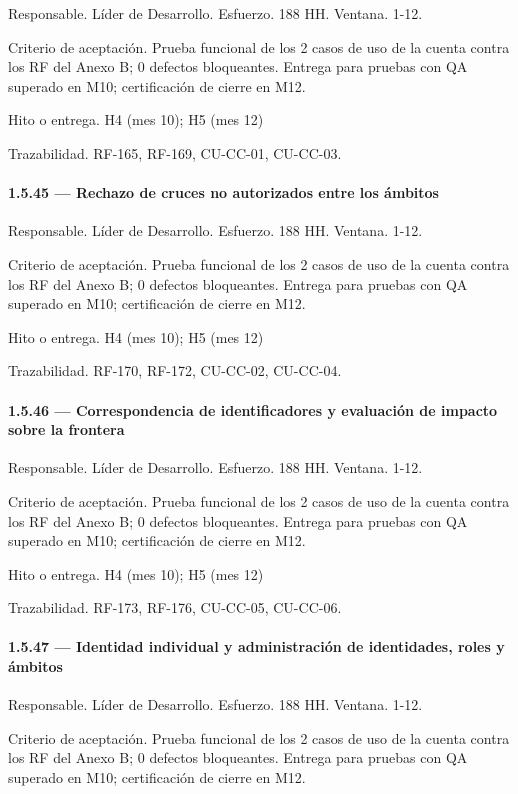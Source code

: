 \documentclass[11pt]{article}
\begin{document}
Responsable. Líder de Desarrollo. Esfuerzo. 188 HH. Ventana. 1-12.

Criterio de aceptación. Prueba funcional de los 2 casos de uso de la cuenta contra los RF del Anexo B; 0 defectos bloqueantes. Entrega para pruebas con QA superado en M10; certificación de cierre en M12.

Hito o entrega. H4 (mes 10); H5 (mes 12)

Trazabilidad. RF-165, RF-169, CU-CC-01, CU-CC-03.

\paragraph{1.5.45 — Rechazo de cruces no autorizados entre los ámbitos}

Responsable. Líder de Desarrollo. Esfuerzo. 188 HH. Ventana. 1-12.

Criterio de aceptación. Prueba funcional de los 2 casos de uso de la cuenta contra los RF del Anexo B; 0 defectos bloqueantes. Entrega para pruebas con QA superado en M10; certificación de cierre en M12.

Hito o entrega. H4 (mes 10); H5 (mes 12)

Trazabilidad. RF-170, RF-172, CU-CC-02, CU-CC-04.

\paragraph{1.5.46 — Correspondencia de identificadores y evaluación de impacto sobre la frontera}

Responsable. Líder de Desarrollo. Esfuerzo. 188 HH. Ventana. 1-12.

Criterio de aceptación. Prueba funcional de los 2 casos de uso de la cuenta contra los RF del Anexo B; 0 defectos bloqueantes. Entrega para pruebas con QA superado en M10; certificación de cierre en M12.

Hito o entrega. H4 (mes 10); H5 (mes 12)

Trazabilidad. RF-173, RF-176, CU-CC-05, CU-CC-06.

\paragraph{1.5.47 — Identidad individual y administración de identidades, roles y ámbitos}

Responsable. Líder de Desarrollo. Esfuerzo. 188 HH. Ventana. 1-12.

Criterio de aceptación. Prueba funcional de los 2 casos de uso de la cuenta contra los RF del Anexo B; 0 defectos bloqueantes. Entrega para pruebas con QA superado en M10; certificación de cierre en M12.
\end{document}
